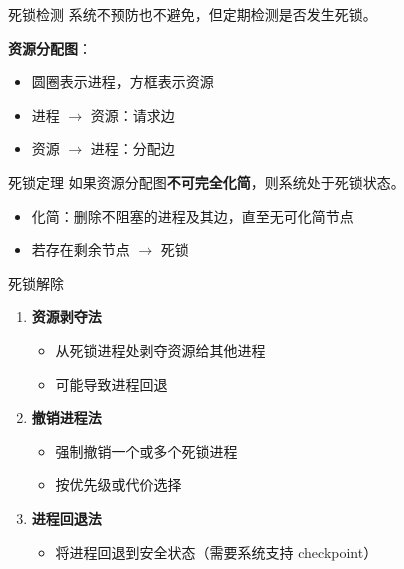 \documentclass[10pt, aspectratio=169]{beamer}
\begin{document}
\begin{frame}{死锁检测}
    系统不预防也不避免，但定期检测是否发生死锁。

    \vspace{0.5em}
    \textbf{资源分配图}：
    \begin{itemize}
        \item 圆圈表示进程，方框表示资源
        \item 进程 $\to$ 资源：请求边
        \item 资源 $\to$ 进程：分配边
    \end{itemize}
    \vspace{0.5em}
    \begin{block}{死锁定理}
        如果资源分配图\textbf{不可完全化简}，则系统处于死锁状态。
    \end{block}
    \begin{itemize}
        \item 化简：删除不阻塞的进程及其边，直至无可化简节点
        \item 若存在剩余节点 $\to$ 死锁
    \end{itemize}
\end{frame}

\begin{frame}{死锁解除}
    \begin{enumerate}
        \item \textbf{资源剥夺法}
        \begin{itemize}
            \item 从死锁进程处剥夺资源给其他进程
            \item 可能导致进程回退
        \end{itemize}
        \item \textbf{撤销进程法}
        \begin{itemize}
            \item 强制撤销一个或多个死锁进程
            \item 按优先级或代价选择
        \end{itemize}
        \item \textbf{进程回退法}
        \begin{itemize}
            \item 将进程回退到安全状态（需要系统支持 checkpoint）
        \end{itemize}
    \end{enumerate}
\end{frame}
\end{document}
